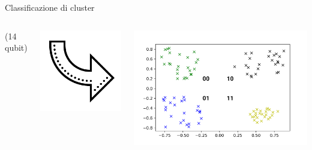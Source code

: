 \documentclass{beamer}
\begin{document}
\begin{frame}{Classificazione di cluster}
\begin{columns}
            \vspace{-.5cm}
            {\tiny \begin{flushright}
                (14 qubit)
            \end{flushright}}
            \begin{turn}{-45}
            \includegraphics[width=\columnwidth]{gfx/icons/icons8-curved-arrow-480.png}
            \end{turn}
            \includegraphics[width=\columnwidth]{gfx/Clusters/cluster_numbered.png}


\end{columns}
\end{frame}
\end{document}
